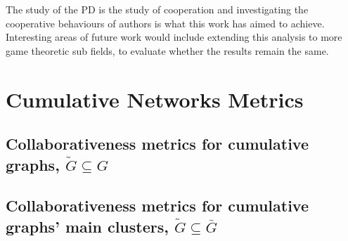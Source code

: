 The study of the PD is the study of cooperation and investigating
the cooperative behaviours of authors is what this work has aimed to achieve.
Interesting areas of future work would include extending this analysis to more
game theoretic sub fields, to evaluate whether the results remain the same.




% 
% 

\section{Cumulative Networks Metrics}\label{appendix:tables}

\subsection{Collaborativeness metrics for cumulative graphs, \(\tilde{G} \subseteq G\)}
\begin{table}[!hbtp]
    \centering
    \resizebox{.8\textwidth}{!}{
    }
\end{table}

\newpage

\subsection{Collaborativeness metrics for cumulative graphs' main clusters, \(\tilde{G} \subseteq \bar{G}\)}
\begin{table}[!hbtp]
    \centering
    \resizebox{.8\textwidth}{!}{
    }
\end{table}


